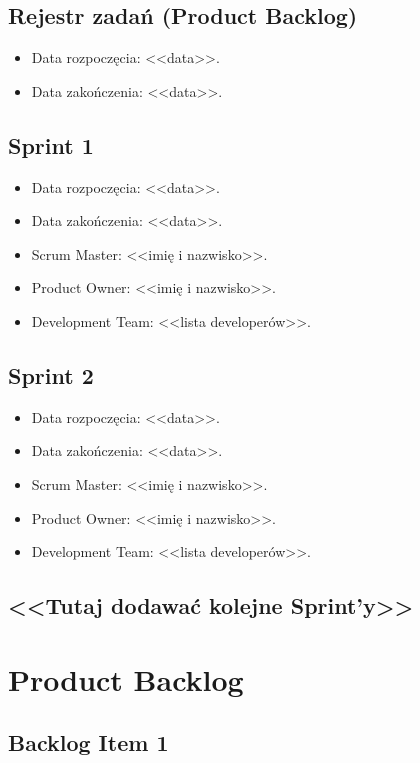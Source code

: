 \documentclass[a4paper]{article}
\begin{document}
\subsection{Rejestr zadań (Product Backlog)}
\label{subsec:RejestrZadan}

\begin{itemize}
\item Data rozpoczęcia: <<data>>.
\item  Data zakończenia: <<data>>.
\end{itemize}

\subsection{Sprint 1}

\begin{itemize}
\item Data rozpoczęcia: <<data>>.
\item Data zakończenia: <<data>>.
\item Scrum Master: <<imię i nazwisko>>.
\item Product Owner: <<imię i nazwisko>>.
\item Development Team: <<lista developerów>>.
\end{itemize}

\subsection{Sprint 2}

\begin{itemize}
\item Data rozpoczęcia: <<data>>.
\item  Data zakończenia: <<data>>.
\item Scrum Master: <<imię i nazwisko>>.
\item Product Owner: <<imię i nazwisko>>.
\item Development Team: <<lista developerów>>.
\end{itemize}

\subsection*{<<Tutaj dodawać kolejne Sprint'y>>}

\section{Product Backlog}

\subsection{Backlog Item 1}
\end{document}
